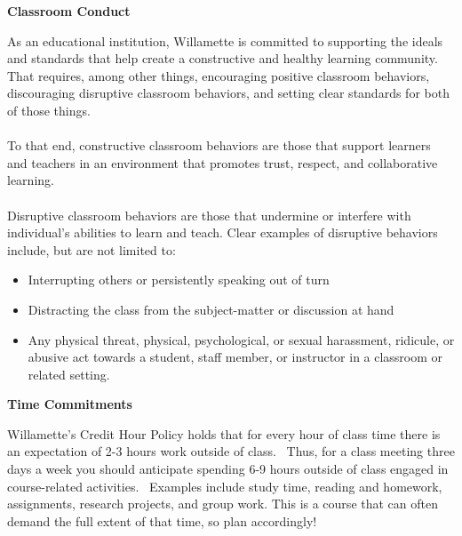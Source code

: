 \documentclass[11pt]{article}
\begin{document}
\vspace{.25cm}
\textbf{Classroom Conduct}

\hspace{3mm}
\hangindent=5mm As an educational institution, Willamette is committed to supporting the ideals and standards that help create a constructive and healthy learning community. That requires, among other things, encouraging positive classroom behaviors, discouraging disruptive classroom behaviors, and setting clear standards for both of those things.
\\\\
To that end, constructive classroom behaviors are those that support learners and teachers in an environment that promotes trust, respect, and collaborative learning.
\\\\
Disruptive classroom behaviors are those that undermine or interfere with individual's abilities to learn and teach. Clear examples of disruptive behaviors include, but are not limited to:
\begin{itemize}
	\item Interrupting others or persistently speaking out of turn
	\item Distracting the class from the subject-matter or discussion at hand
	\item Any physical threat, physical, psychological, or sexual harassment, ridicule, or abusive act towards a student, staff member, or instructor in a classroom or related setting.
\end{itemize}
\vspace{0.25cm}

\textbf{Time Commitments}

\hspace{3mm}
\hangindent=5mm Willamette's Credit Hour Policy holds that for every hour of class time there is an expectation of 2-3 hours work outside of class.  Thus, for a class meeting three 
days a week you should anticipate spending 6-9 hours outside of class engaged in course-related activities.  Examples include study time, reading and homework, assignments, research projects, and group work. This is a course that can often demand the full extent of that time, so plan accordingly!

\vspace{0.25cm}
\end{document}
